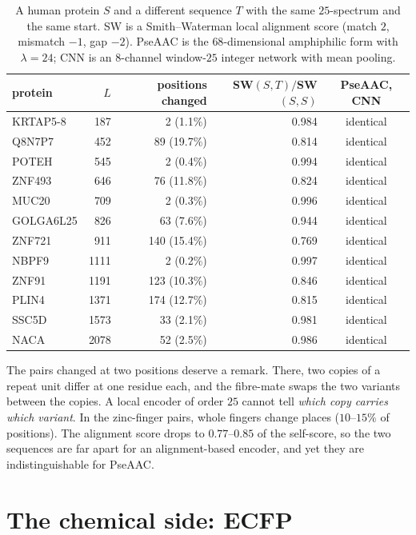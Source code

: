 \documentclass[11pt]{article}
\theoremstyle{plain}
\theoremstyle{definition}
\theoremstyle{remark}
\begin{document}
\begin{table}[t]
\centering\small
\begin{tabular}{lrrrc}
\toprule
protein & $L$ & positions changed & SW$(S,T)/$SW$(S,S)$ & PseAAC, CNN\\
\midrule
KRTAP5-8 & 187 & 2 (1.1\%) & 0.984 & identical\\
Q8N7P7 & 452 & 89 (19.7\%) & 0.814 & identical\\
POTEH & 545 & 2 (0.4\%) & 0.994 & identical\\
ZNF493 & 646 & 76 (11.8\%) & 0.824 & identical\\
MUC20 & 709 & 2 (0.3\%) & 0.996 & identical\\
GOLGA6L25 & 826 & 63 (7.6\%) & 0.944 & identical\\
ZNF721 & 911 & 140 (15.4\%) & 0.769 & identical\\
NBPF9 & 1111 & 2 (0.2\%) & 0.997 & identical\\
ZNF91 & 1191 & 123 (10.3\%) & 0.846 & identical\\
PLIN4 & 1371 & 174 (12.7\%) & 0.815 & identical\\
SSC5D & 1573 & 33 (2.1\%) & 0.981 & identical\\
NACA & 2078 & 52 (2.5\%) & 0.986 & identical\\
\bottomrule
\end{tabular}
\caption{A human protein $S$ and a different sequence $T$ with the same $25$-spectrum and the same
start. SW is a Smith--Waterman local alignment score (match $2$, mismatch $-1$, gap $-2$). PseAAC is the $68$-dimensional amphiphilic form with $\lambda=24$; CNN is an
$8$-channel window-$25$ integer network with mean pooling.}\label{tab:mates}
\end{table}

The pairs changed at two positions deserve a remark. There, two copies of a repeat unit differ at
one residue each, and the fibre-mate swaps the two variants between the copies. A local encoder of
order $25$ cannot tell \emph{which copy carries which variant}. In the zinc-finger pairs, whole
fingers change places ($10$--$15\%$ of positions). The alignment score drops to $0.77$--$0.85$ of the
self-score, so the two sequences are far apart for an alignment-based encoder, and yet they are
indistinguishable for PseAAC.

\section{The chemical side: ECFP}\label{sec:ecfp}
\end{document}

